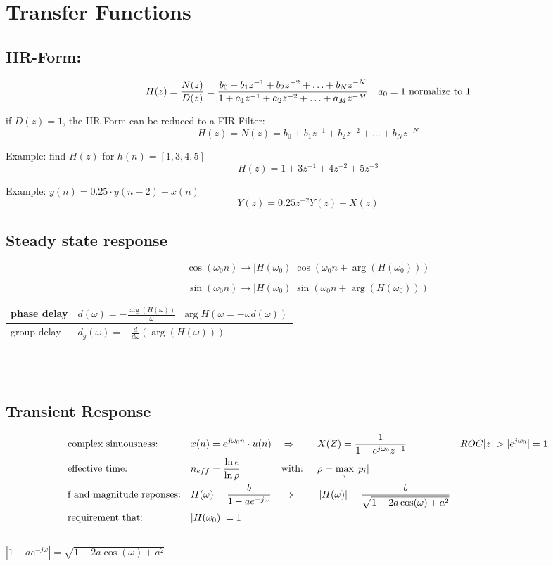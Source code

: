 \section{Transfer Functions}
\subsection{IIR-Form:}
\begin{align}
H(z) = \frac{N(z)}{D(z)}
		= \frac{b_0 + b_1 z^{-1} + b_2 z^{-2} + \ldots + b_N z^{-N}}{1 + a_1 z^{-1} + a_2 z^{-2} + \ldots + a_M z^{-M} } && a_0 = 1 \text{ normalize to } 1 \notag
\end{align}

if $D(z) = 1$, the IIR Form can be reduced to a FIR Filter:
\[
	H(z) = N(z) = b_0 + b_1 z^{-1} + b_2 z^{-2} + \ldots + b_N z^{-N}
\]

Example: find $H(z)$ for $h(n) = \left[1,3,4,5\right]$
\[ H(z) = 1 + 3z^{-1} + 4z^{-2} + 5z^{-3}\]

Example: $y(n) = 0.25 \cdot y(n-2) + x(n) $
\[
	Y(z) = 0.25z^{-2}Y(z) + X(z)
\]

\subsection{Steady state response}
\[\cos(\omega_0 n) \rightarrow \left|H(\omega_0) \right| \cos(\omega_0 n + \arg(H(\omega_0))) \]

\[\sin(\omega_0 n) \rightarrow \left|H(\omega_0) \right| \sin(\omega_0 n + \arg(H(\omega_0))) \]

\begin{tabularx}{0.6\textwidth}{|l|X|}
	\hline
	phase delay & $d(\omega) = - \frac{\arg(H(\omega))}{\omega}$\ \qquad $\arg H(\omega = -\omega d(\omega))$
	\\ \hline 
	group delay & $d_g(\omega) = -\frac{d}{d\omega}(\arg(H(\omega)))$	
	\\ \hline
\end{tabularx}\\ \\

\subsection{Transient Response}
\begin{align}
&\text{complex sinuousness:} & & x(n) = e^{j \omega_0 n} \cdot u(n) && \Rightarrow && X(Z) = \frac{1}{1-e^{j \omega_0} z^{-1}} && ROC |z| > |e^{j\omega_0}|=1\notag\\ 
&\text{effective time:} && n_{eff} = \frac{\ln \epsilon}{\ln \rho} &&\text{with: }& &\rho = \max\limits_{i}\left|p_i \right| &&\notag\\
&\text{f and magnitude reponses:} && H(\omega)=\frac{b}{1-ae^{-j\omega}} &&\Rightarrow &&
\left| H(\omega)\right| = \frac{b}{\sqrt{1-2a\cos(\omega) + a^2}} &&\notag\\
&\text{requirement that:} && |H(\omega_0)|=1 &&&& &&\notag
\end{align}\\
$\left| 1-a e^{-j\omega}\right| = \sqrt{1-2a\cos(\omega) + a^2}$\\

